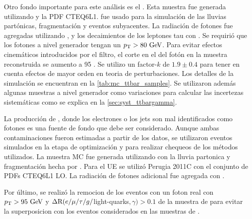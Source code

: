 Otro fondo importante para este análisis es el {\ttgam}. Esta muestra fue
generada utilizando {\madgraph}\cite{Alwall:2007st} y la PDF CTEQ6L1.
{\pythiasix}\cite{pythia} fue usado para la simulación de las lluvias
partónicas, fragmentación y eventos subyacentes. La radiación de fotones fue
agregadas utilizando {\photos}\cite{photos}, y los decaimientos de los leptones
tau con {\tauola}\cite{tauola}. Se requirió que los fotones a nivel generador
tengan un $\pt > 80 \gev$. Para evitar efectos cinemáticos introducidos por el
filtro, el corte en el {\pt} del fotón en la muestra reconstruida se aumento a
95 {\gev}. Se utilizo un factor-$k$ de $1.9 \pm 0.4$\cite{Melnikov:2011ta, tth}
para tener en cuenta efectos de mayor orden en teoria de perturbaciones.
Los detalles de la simulación se encuentran en la \cref{tab:mc_ttbar_samples}.
Se utilizaron además algunas muestras a nivel generador como variaciones para calcular
las incertezas sistemáticas como se explica en la \cref{sec:syst_ttbargamma}.

La producción de {\ttbar}, donde los electrones o los jets son mal identificados
como fotones es una fuente de fondo que debe ser considerado. Aunque ambas
contaminaciones fueron estimadas a partir de los datos, se utilizaron eventos simulados
en la etapa de optimización y para realizar chequeos de los métodos utilizados.
La
muestra MC fue generada utilizando
{\powheg}\cite{Nason:2004rx,Frixione:2007vw,Alioli:2010xd} con la lluvia
partonica y fragmentación hecha por {\pythia}. Para el UE se utilizó Perugia
2011C con el
conjunto de PDFs CTEQ6L1 LO. La radiación de fotones adicional fue agregada con
{\photos}\cite{photos}.

Por último, se realizó la remocion
de los eventos con un foton real con $\pt > 95 \gev$ y $\Delta{\rm R}(e/\mu/\tau/g/$light-quarks$,
\gamma) > 0.1$ de la muestra de {\ttbar} para evitar la superposicion con los eventos
considerados en las muestras de {\ttgam}.


